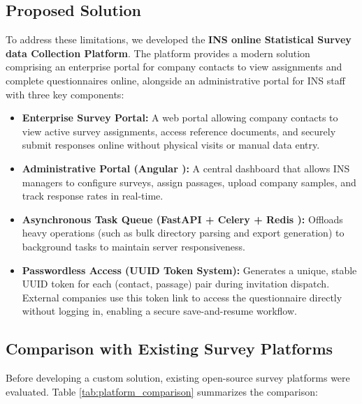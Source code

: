\documentclass[12pt,a4paper]{report}
\begin{document}
\subsection{Proposed Solution}
To address these limitations, we developed the \textbf{INS online Statistical Survey data Collection Platform}. The platform provides a modern solution comprising an enterprise portal for company contacts to view assignments and complete questionnaires online, alongside an administrative portal for INS staff with three key components:
\begin{itemize}
    \item \textbf{Enterprise Survey Portal:} A web portal allowing company contacts to view active survey assignments, access reference documents, and securely submit responses online without physical visits or manual data entry.
    \item \textbf{Administrative Portal (Angular \cite{angular}):} A central dashboard that allows INS managers to configure surveys, assign passages, upload company samples, and track response rates in real-time.
    \item \textbf{Asynchronous Task Queue (FastAPI \cite{fastapi} + Celery \cite{celery} + Redis \cite{redis}):} Offloads heavy operations (such as bulk directory parsing and export generation) to background tasks to maintain server responsiveness.
    \item \textbf{Passwordless Access (UUID Token System):} Generates a unique, stable UUID token \cite{rfc4122} for each (contact, passage) pair during invitation dispatch. External companies use this token link to access the questionnaire directly without logging in, enabling a secure save-and-resume workflow.
\end{itemize}

\subsection{Comparison with Existing Survey Platforms}
Before developing a custom solution, existing open-source survey platforms were evaluated. Table \ref{tab:platform_comparison} summarizes the comparison:
\end{document}
